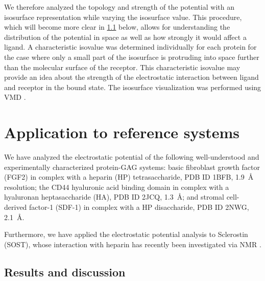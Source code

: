 We therefore analyzed the topology and strength of the potential with an
isosurface representation while varying the isosurface value. This procedure,
which will become more clear in \cref{bspred:appl_discussion} below, allows for
understanding the distribution of the potential in space as well as how strongly
it would affect a ligand. A characteristic isovalue was determined individually
for each protein for the case where only a small part of the isosurface is
protruding into space further than the molecular surface of the receptor. This
characteristic isovalue may provide an idea about the strength of the
electrostatic interaction between ligand and receptor in the bound state. The
isosurface visualization was performed using VMD \cite{vmd_1996}.

\section{Application to reference systems}
\label{bspred:application}

We have analyzed the electrostatic potential of the following well-understood
and experimentally characterized protein-GAG systems: basic fibroblast growth
factor (FGF2) in complex with a heparin (HP) tetrasaccharide, PDB ID 1BFB,
\SI{1.9}{\angstrom} resolution; the CD44 hyaluronic acid binding domain in
complex with a hyaluronan heptasaccharide (HA), PDB ID 2JCQ,
\SI{1.3}{\angstrom}; and stromal cell-derived factor-1 (SDF-1) in complex with a
HP disaccharide, PDB ID 2NWG, \SI{2.1}{\angstrom}.

Furthermore, we have applied the electrostatic potential analysis to Sclerostin
(SOST), whose interaction with heparin has recently been investigated via NMR
\cite{sost_heparin_2009}.

\subsection{Results and discussion}
\label{bspred:appl_discussion}

